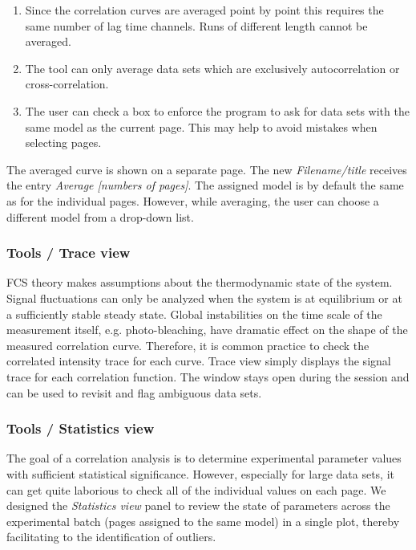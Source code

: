 \begin{enumerate}
\item Since the correlation curves are averaged point by point this requires the same number of lag time channels. Runs of different length cannot be averaged.
\item The tool can only average data sets which are exclusively autocorrelation or cross-correlation.
\item The user can check a box to enforce the program to ask for data sets with the same model as the current page. This may help to avoid mistakes when selecting pages.
\end{enumerate}
The averaged curve is shown on a separate page. The new \textit{Filename/title} receives the entry \textit{Average [numbers of pages]}. The assigned model is by default the same as for the individual pages. However, while averaging, the user can choose a different model from a drop-down list. 

\subsubsection{Tools / Trace view}
\label{sec:menub.tools.trace}
FCS theory makes assumptions about the thermodynamic state of the system. Signal fluctuations can only be analyzed when the system is at equilibrium or at a sufficiently stable steady state. Global instabilities on the time scale of the measurement itself, e.g. photo-bleaching, have dramatic effect on the shape of the measured correlation curve. Therefore, it is common practice to check the correlated intensity trace for each curve. Trace view simply displays the signal trace for each correlation function. The window stays open during the session and can be used to revisit and flag ambiguous data sets.

\subsubsection{Tools / Statistics view}
\label{sec:menub.tools.stati}
The goal of a correlation analysis is to determine experimental parameter values with sufficient statistical significance. However, especially for large data sets, it can get quite laborious to check all of the individual values on each page. We designed the \textit{Statistics view} panel to review the state of parameters across the experimental batch (pages assigned to the same model) in a single plot, thereby facilitating to the identification of outliers.

